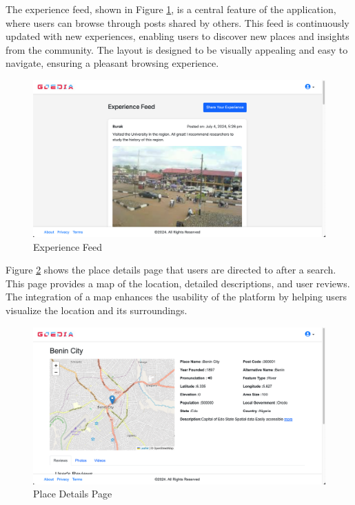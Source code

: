The experience feed, shown in Figure \ref{fig:userfeed}, is a central feature of the application, where users can browse through posts shared by others. This feed is continuously updated with new experiences, enabling users to discover new places and insights from the community. The layout is designed to be visually appealing and easy to navigate, ensuring a pleasant browsing experience.

\begin{figure}[H]
    \centering
    \includegraphics[width=\textwidth]{userfeed.png}
    \caption{Experience Feed}
    \label{fig:userfeed}
\end{figure}

Figure \ref{fig:placedetails} shows the place details page that users are directed to after a search. This page provides a map of the location, detailed descriptions, and user reviews. The integration of a map enhances the usability of the platform by helping users visualize the location and its surroundings.

\begin{figure}[H]
    \centering
    \includegraphics[width=\textwidth]{placedetails.png}
    \caption{Place Details Page}
    \label{fig:placedetails}
\end{figure}

